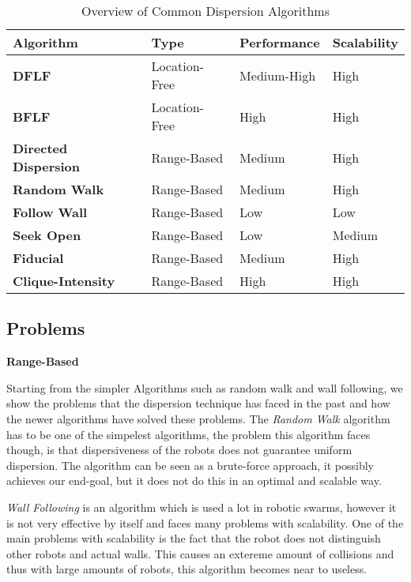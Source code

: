   \begin{table}[H]
  \renewcommand{\arraystretch}{1.3}
  \caption{Overview of Common Dispersion Algorithms}
  \label{table_alg_dispersion}
  \centering
    \begin{tabular}{|l|l|l|l|}
    \hline
    \bfseries Algorithm & \bfseries Type & \bfseries Performance & \bfseries Scalability\\
    \hline
    \bfseries DFLF& Location-Free & Medium-High & High\\\hline
    \bfseries BFLF & Location-Free & High & High\\\hline
    \bfseries Directed Dispersion & Range-Based & Medium & High\\\hline
    \bfseries Random Walk& Range-Based & Medium & High\\\hline
    \bfseries Follow Wall& Range-Based & Low & Low\\\hline
    \bfseries Seek Open& Range-Based & Low & Medium\\\hline
    \bfseries Fiducial& Range-Based & Medium & High\\\hline
    \bfseries Clique-Intensity& Range-Based & High & High\\\hline
    \end{tabular}
  \end{table}


  \subsection{Problems}
  \textbf{Range-Based}

  Starting from the simpler Algorithms such as random walk and wall following, we show the problems that the dispersion technique has faced in the past and how the newer algorithms have solved these problems. The \emph{Random Walk} algorithm has to be one of the simpelest algorithms, the problem this algorithm faces though, is that dispersiveness of the robots does not guarantee uniform dispersion. The algorithm can be seen as a brute-force approach, it possibly achieves our end-goal, but it does not do this in an optimal and scalable way.

  \emph{Wall Following} is an algorithm which is used a lot in robotic swarms, however it is not very effective by itself and faces many problems with scalability.  One of the main problems with scalability is the fact that the robot does not distinguish other robots and actual walls. This causes an extereme amount of collisions and thus with large amounts of robots, this algorithm becomes near to useless. 

